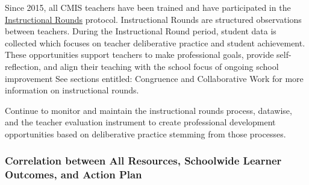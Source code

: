 \begin{findings}
Since 2015, all CMIS teachers have been trained and have participated in the \href{https://drive.google.com/a/cmis.ac.th/file/d/0B0TYmzaZNi3fUzVFUEdzTURtakk/view?usp=sharing}{Instructional Rounds} protocol. Instructional Rounds are structured observations between teachers. During the Instructional Round period, student data is collected which focuses on teacher deliberative practice and student achievement. These opportunities support teachers to make professional goals, provide self-reflection, and align their teaching with the school focus of ongoing school improvement See sections entitled: Congruence and Collaborative Work for more information on instructional rounds. 


Continue to monitor and maintain the instructional rounds process, datawise, and the teacher evaluation instrument to create professional development opportunities based on deliberative practice stemming from those processes.
\end{findings}

\subsubsection{Correlation between All Resources, Schoolwide Learner Outcomes, and Action Plan}



